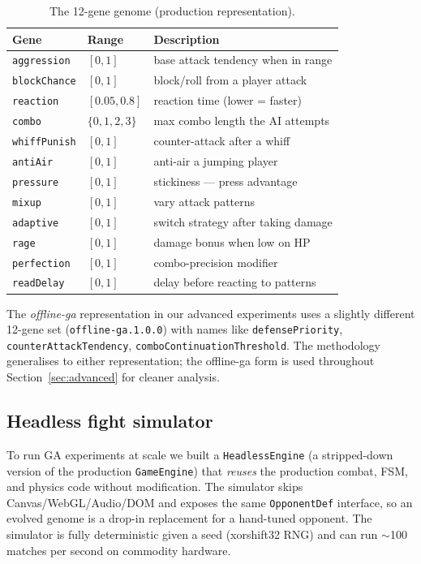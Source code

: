 \documentclass[conference]{IEEEtran}
\begin{document}
\begin{table}[!t]
\centering
\caption{The 12-gene genome (production representation).}
\label{tab:genome}
\begin{tabular}{lll}
\toprule
\textbf{Gene} & \textbf{Range} & \textbf{Description} \\
\midrule
\texttt{aggression}     & $[0, 1]$      & base attack tendency when in range \\
\texttt{blockChance}    & $[0, 1]$      & block/roll from a player attack \\
\texttt{reaction}       & $[0.05, 0.8]$ & reaction time (lower = faster) \\
\texttt{combo}          & $\{0,1,2,3\}$ & max combo length the AI attempts \\
\texttt{whiffPunish}    & $[0, 1]$      & counter-attack after a whiff \\
\texttt{antiAir}        & $[0, 1]$      & anti-air a jumping player \\
\texttt{pressure}       & $[0, 1]$      & stickiness --- press advantage \\
\texttt{mixup}          & $[0, 1]$      & vary attack patterns \\
\texttt{adaptive}       & $[0, 1]$      & switch strategy after taking damage \\
\texttt{rage}           & $[0, 1]$      & damage bonus when low on HP \\
\texttt{perfection}     & $[0, 1]$      & combo-precision modifier \\
\texttt{readDelay}      & $[0, 1]$      & delay before reacting to patterns \\
\bottomrule
\end{tabular}
\end{table}

The \emph{offline-ga} representation in our advanced experiments uses a slightly different 12-gene set (\texttt{offline-ga.1.0.0}) with names like \texttt{defensePriority}, \texttt{counterAttackTendency}, \texttt{comboContinuationThreshold}. The methodology generalises to either representation; the offline-ga form is used throughout Section~\ref{sec:advanced} for cleaner analysis.

\subsection{Headless fight simulator}

To run GA experiments at scale we built a \texttt{HeadlessEngine} (a stripped-down version of the production \texttt{GameEngine}) that \emph{reuses} the production combat, FSM, and physics code without modification. The simulator skips Canvas/WebGL/Audio/DOM and exposes the same \texttt{OpponentDef} interface, so an evolved genome is a drop-in replacement for a hand-tuned opponent. The simulator is fully deterministic given a seed (xorshift32 RNG) and can run $\sim$100 matches per second on commodity hardware.
\end{document}
